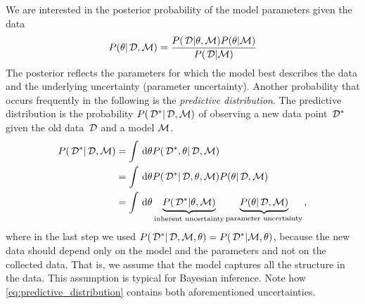 We are interested in the posterior probability of the model parameters given the data
\begin{align}\label{eq:posterior}
	{P(\theta| \,\mathcal{D}, \mathcal{M})} = \frac{{P(\,\mathcal{D} | \theta, \mathcal{M})} {P(\theta | \mathcal{M})}}{{P(\,\mathcal{D} | \mathcal{M})}}
\end{align}
The posterior reflects the parameters for which the model best describes the data and the underlying uncertainty (parameter uncertainty).
Another probability that occurs frequently in the following is the \emph{predictive distribution}.
The predictive distribution is the probability ${P(\,\mathcal{D}^* | \,\mathcal{D}, \mathcal{M})}$ of observing a new data point $\,\mathcal{D}^*$ given the old data $\,\mathcal{D}$ and a model $\mathcal{M}$.
\begin{align}
	{P(\,\mathcal{D}^* | \,\mathcal{D}, \mathcal{M})}
	&= \int \,\mathrm{d} \theta
		{P(\,\mathcal{D}^*, \theta| \,\mathcal{D}, \mathcal{M})} \\
	&= \int \,\mathrm{d} \theta
		{P(\,\mathcal{D}^* | \,\mathcal{D}, \theta, \mathcal{M})}
		{P(\theta| \,\mathcal{D}, \mathcal{M})} \\
	&= \int \,\mathrm{d} \theta
		\underbrace{
		{P(\,\mathcal{D}^* | \theta, \mathcal{M})}}_{\text{inherent uncertainty}}
		\underbrace{
		{P(\theta | \,\mathcal{D}, \mathcal{M})}}_{\text{parameter uncertainty}} \,, \label{eq:predictive_distribution}
\end{align}
where in the last step we used ${P(\,\mathcal{D}^* | \,\mathcal{D}, \mathcal{M}, \theta)} = {P(\,\mathcal{D}^* | \mathcal{M}, \theta)}$, because the new data should depend only on the model and the parameters and not on the collected data. That is, we assume that the model captures all the structure in the data. This assumption is typical for Bayesian inference. Note how \cref{eq:predictive_distribution} contains both aforementioned uncertainties. 

